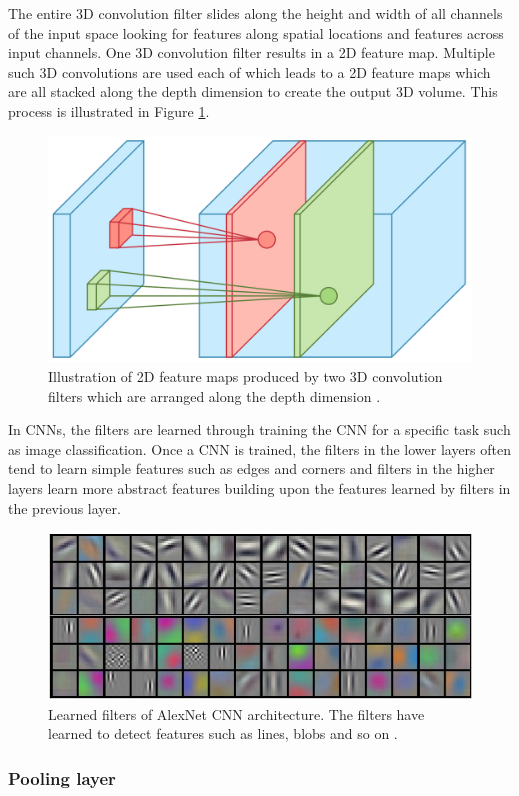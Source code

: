 The entire 3D convolution filter slides along the height and width of all channels of the input space looking for features along spatial locations and features across input channels. One 3D convolution filter results in a 2D feature map. Multiple such 3D convolutions are used each of which leads to a 2D feature maps which are all stacked along the depth dimension to create the output 3D volume. This process is illustrated in Figure \ref{Fig:3dconv}.

	\begin{figure}[h]
		\centering
		\includegraphics[width=.3\linewidth]{images/3d_conv}
		\caption{Illustration of 2D feature maps produced by two 3D convolution filters which are arranged along the depth dimension  \cite{towardsdatascience}.}
		\label{Fig:3dconv}
	\end{figure}
	
In CNNs, the filters are learned through training the CNN for a specific task such as image classification. Once a CNN is trained, the filters in the lower layers often tend to learn simple features such as edges and corners and filters in the higher layers learn more abstract features building upon the features learned by filters in the previous layer. 

	\begin{figure}[h]
		\centering
		\includegraphics[width=.8\linewidth]{images/conv_template}
		\caption{Learned filters of AlexNet CNN architecture. The filters have learned to detect features such as lines, blobs and so on \cite{cs231n}.}
		\label{Fig:conv_template}
	\end{figure}
	

\subsubsection{Pooling layer}

